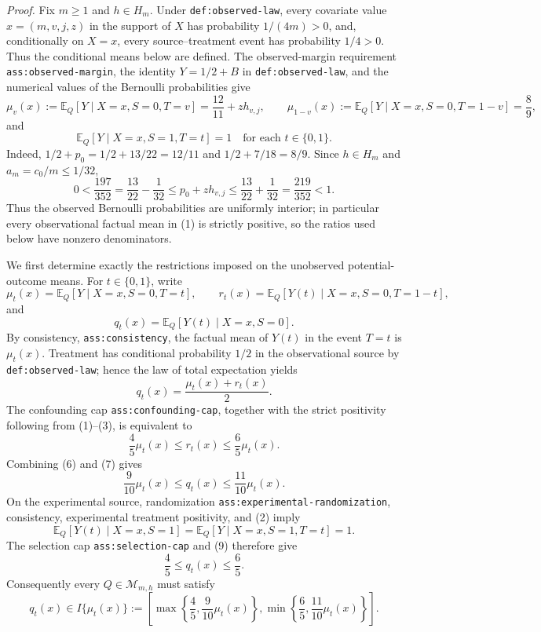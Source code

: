\noindent\textit{Proof.}
Fix \(m\geq 1\) and \(h\in H_m\).  Under
\texttt{def:observed-law}, every covariate value
\(x=(m,v,j,z)\) in the support of \(X\) has probability
\(1/(4m)>0\), and, conditionally on \(X=x\), every source--treatment
event has probability \(1/4>0\).  Thus the conditional means below
are defined.  The observed-margin requirement
\texttt{ass:observed-margin}, the identity \(Y=1/2+B\) in
\texttt{def:observed-law}, and the numerical values of the Bernoulli
probabilities give
\[
 \mu_v(x):=\mathbb E_Q[Y\mid X=x,S=0,T=v]
     =\frac{12}{11}+z h_{v,j},
 \qquad
 \mu_{1-v}(x):=\mathbb E_Q[Y\mid X=x,S=0,T=1-v]
     =\frac89,
 \tag{1}
\]
and
\[
 \mathbb E_Q[Y\mid X=x,S=1,T=t]=1
 \quad\text{for each }t\in\{0,1\}.
 \tag{2}
\]
Indeed, \(1/2+p_0=1/2+13/22=12/11\) and
\(1/2+7/18=8/9\).  Since \(h\in H_m\) and
\(a_m=c_0/m\leq1/32\),
\[
 0<\frac{197}{352}
   =\frac{13}{22}-\frac1{32}
 \leq p_0+z h_{v,j}
 \leq\frac{13}{22}+\frac1{32}
   =\frac{219}{352}<1.
 \tag{3}
\]
Thus the observed Bernoulli probabilities are uniformly interior; in
particular every observational factual mean in (1) is strictly
positive, so the ratios used below have nonzero denominators.

We first determine exactly the restrictions imposed on the unobserved
potential-outcome means.  For \(t\in\{0,1\}\), write
\[
 \mu_t(x)=\mathbb E_Q[Y\mid X=x,S=0,T=t],\qquad
 r_t(x)=\mathbb E_Q[Y(t)\mid X=x,S=0,T=1-t],
 \tag{4}
\]
and
\[
 q_t(x)=\mathbb E_Q[Y(t)\mid X=x,S=0].
 \tag{5}
\]
By consistency, \texttt{ass:consistency}, the factual mean of
\(Y(t)\) in the event \(T=t\) is \(\mu_t(x)\).  Treatment has
conditional probability \(1/2\) in the observational source by
\texttt{def:observed-law}; hence the law of total expectation yields
\[
 q_t(x)=\frac{\mu_t(x)+r_t(x)}2.
 \tag{6}
\]
The confounding cap \texttt{ass:confounding-cap}, together with the
strict positivity following from (1)--(3), is equivalent to
\[
 \frac45\mu_t(x)\leq r_t(x)\leq\frac65\mu_t(x).
 \tag{7}
\]
Combining (6) and (7) gives
\[
 \frac9{10}\mu_t(x)\leq q_t(x)
     \leq\frac{11}{10}\mu_t(x).
 \tag{8}
\]
On the experimental source, randomization
\texttt{ass:experimental-randomization}, consistency, experimental
treatment positivity, and (2) imply
\[
 \mathbb E_Q[Y(t)\mid X=x,S=1]
 =\mathbb E_Q[Y\mid X=x,S=1,T=t]=1.
 \tag{9}
\]
The selection cap \texttt{ass:selection-cap} and (9) therefore give
\[
 \frac45\leq q_t(x)\leq\frac65.
 \tag{10}
\]
Consequently every \(Q\in\mathcal M_{m,h}\) must satisfy
\[
 q_t(x)\in I\{\mu_t(x)\}:=
 \left[
  \max\left\{\frac45,\frac9{10}\mu_t(x)\right\},
  \min\left\{\frac65,\frac{11}{10}\mu_t(x)\right\}
 \right].
 \tag{11}
\]


